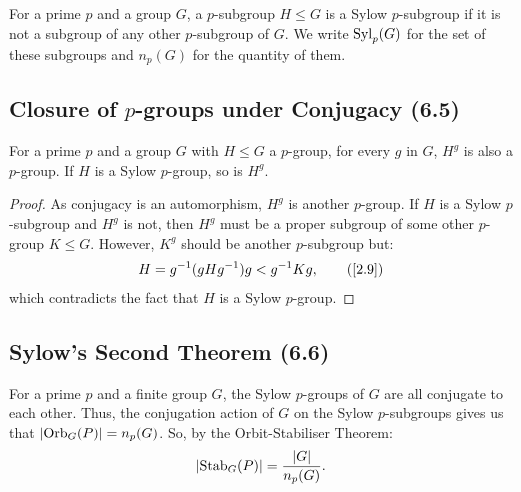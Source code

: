 For a prime $p$ and a group $G$, a $p$-subgroup $H \leq G$
is a Sylow $p$-subgroup if it is not a subgroup of any other
$p$-subgroup of $G$. We write $\operatorname{Syl}_p(G)$ for the set of
these subgroups and $n_p(G)$ for the quantity of them.

\subsection{Closure of $p$-groups under Conjugacy (6.5)}  \label{6.5}

For a prime $p$ and a group $G$ with $H \leq G$ a $p$-group,
for every $g$ in $G$, $H^g$ is also a $p$-group.
If $H$ is a Sylow $p$-group, so is $H^g$. 

\begin{proof}
    As conjugacy is an automorphism, $H^g$ is another $p$-group.
    If $H$ is a Sylow $p$-subgroup and $H^g$ is not, then $H^g$ 
    must be a proper subgroup of some other $p$-group $K \leq G$.
    However, $K^g$ should be another $p$-subgroup but: \begin{align*}
        H = g^{-1}(gHg^{-1})g < g^{-1}Kg, \tag{\ref{2.9}}
    \end{align*} which contradicts the fact that $H$ is a
    Sylow $p$-group.
\end{proof}

\subsection{Sylow's Second Theorem (6.6)}  \label{6.6}

For a prime $p$ and a finite group $G$, the Sylow $p$-groups
of $G$ are all conjugate to each other.  Thus, 
the conjugation action of $G$ on the Sylow $p$-subgroups 
gives us that $|\!\operatorname{Orb}_G(P)| = n_p(G)$. So, by the Orbit-Stabiliser
Theorem: \begin{align*}
    |\!\operatorname{Stab}_G(P)| = \frac{|G|}{n_p(G)}.
\end{align*}

